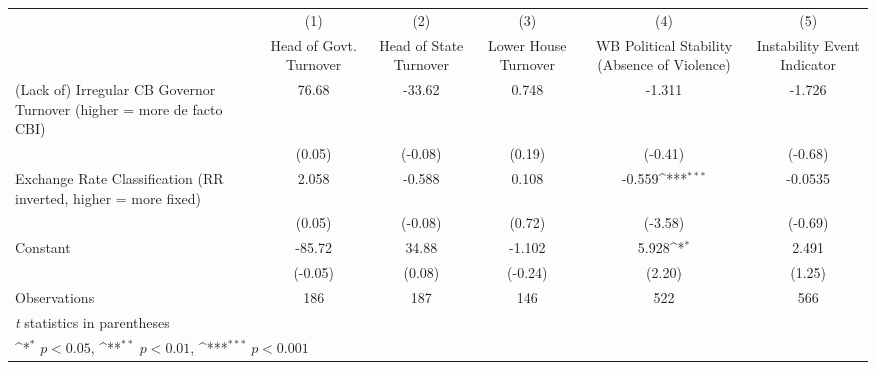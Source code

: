 {
\def\sym#1{\ifmmode^{#1}\else\(^{#1}\)\fi}
\begin{tabular*}{\linewidth}{@{\hskip\tabcolsep\extracolsep\fill}l*{5}{c}}
\hline\hline
                &\multicolumn{1}{c}{(1)}&\multicolumn{1}{c}{(2)}&\multicolumn{1}{c}{(3)}&\multicolumn{1}{c}{(4)}&\multicolumn{1}{c}{(5)}\\
                &\multicolumn{1}{c}{Head of Govt. Turnover}&\multicolumn{1}{c}{Head of State Turnover}&\multicolumn{1}{c}{Lower House Turnover}&\multicolumn{1}{c}{WB Political Stability (Absence of Violence)}&\multicolumn{1}{c}{Instability Event Indicator}\\
\hline
(Lack of) Irregular CB Governor Turnover (higher = more de facto CBI)&    76.68         &   -33.62         &    0.748         &   -1.311         &   -1.726         \\
                &   (0.05)         &  (-0.08)         &   (0.19)         &  (-0.41)         &  (-0.68)         \\
[1em]
Exchange Rate Classification (RR inverted, higher = more fixed)&    2.058         &   -0.588         &    0.108         &   -0.559\sym{***}&  -0.0535         \\
                &   (0.05)         &  (-0.08)         &   (0.72)         &  (-3.58)         &  (-0.69)         \\
[1em]
Constant        &   -85.72         &    34.88         &   -1.102         &    5.928\sym{*}  &    2.491         \\
                &  (-0.05)         &   (0.08)         &  (-0.24)         &   (2.20)         &   (1.25)         \\
\hline
Observations    &      186         &      187         &      146         &      522         &      566         \\
\hline\hline
\multicolumn{6}{l}{\footnotesize \textit{t} statistics in parentheses}\\
\multicolumn{6}{l}{\footnotesize \sym{*} \(p<0.05\), \sym{**} \(p<0.01\), \sym{***} \(p<0.001\)}\\
\end{tabular*}
}
